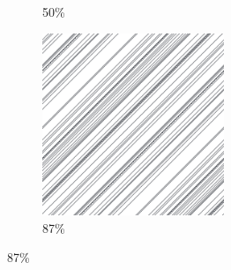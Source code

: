 \documentclass[12pt, fleqn]{report}                             %
\theoremstyle{break}                                            %
\begin{document}
\begin{figure}[ht!]
\begin{subfigure}[b]{0.4\linewidth}
          \caption{50\%}
        \end{subfigure}
        \begin{subfigure}[b]{0.4\linewidth}
          \includegraphics[width=0.6\textwidth]{Images/154/d.png}
          \caption{87\%}
        \end{subfigure}
      \end{figure}
\end{document}
